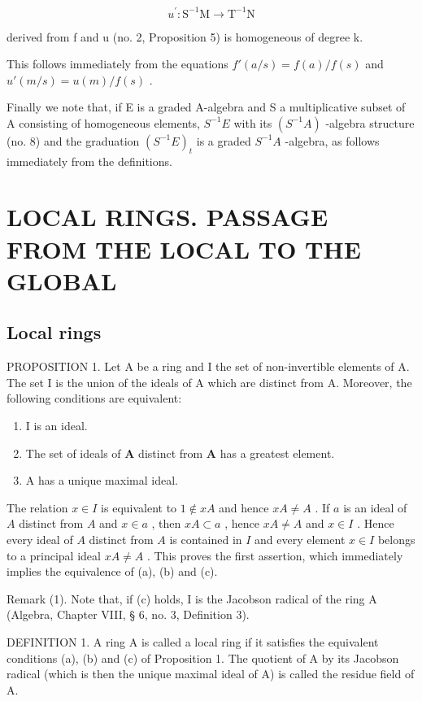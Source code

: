 \[
u ^ {\prime} \colon \mathrm{S} ^ {- 1} \mathrm{M} \rightarrow \mathrm{T} ^ {- 1} \mathrm{N}
\]

derived from f and u (no. 2, Proposition 5) is homogeneous of degree k.

This follows immediately from the equations \(f'(a / s) = f(a) / f(s)\) and \(u'(m / s) = u(m) / f(s)\) .

Finally we note that, if E is a graded A-algebra and S a multiplicative subset of A consisting of homogeneous elements, \(S^{-1}E\) with its \((S^{-1}A)\) -algebra structure (no. 8) and the graduation \((S^{-1}E)_{t}\) is a graded \(S^{-1}A\) -algebra, as follows immediately from the definitions.

\section{LOCAL RINGS. PASSAGE FROM THE LOCAL TO THE GLOBAL}

\subsection{Local rings}

PROPOSITION 1. Let A be a ring and I the set of non-invertible elements of A. The set I is the union of the ideals of A which are distinct from A. Moreover, the following conditions are equivalent:

\begin{enumerate}
\def\labelenumi{(\alph{enumi})}
\item
  I is an ideal.
\item
  The set of ideals of \(\mathbf{A}\) distinct from \(\mathbf{A}\) has a greatest element.
\item
  A has a unique maximal ideal.
\end{enumerate}

The relation \(x \in I\) is equivalent to \(1 \notin xA\) and hence \(xA \neq A\) . If \(a\) is an ideal of \(A\) distinct from \(A\) and \(x \in a\) , then \(xA \subset a\) , hence \(xA \neq A\) and \(x \in I\) . Hence every ideal of \(A\) distinct from \(A\) is contained in \(I\) and every element \(x \in I\) belongs to a principal ideal \(xA \neq A\) . This proves the first assertion, which immediately implies the equivalence of (a), (b) and (c).

Remark (1). Note that, if (c) holds, I is the Jacobson radical of the ring A (Algebra, Chapter VIII, § 6, no. 3, Definition 3).

DEFINITION 1. A ring A is called a local ring if it satisfies the equivalent conditions (a), (b) and (c) of Proposition 1. The quotient of A by its Jacobson radical (which is then the unique maximal ideal of A) is called the residue field of A.

